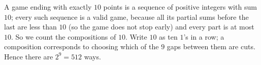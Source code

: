 A game ending with exactly $10$ points is a sequence of positive integers with sum $10$; every such sequence is a valid game, because all its partial sums before the last are less than $10$ (so the game does not stop early) and every part is at most $10$. So we count the compositions of $10$. Write $10$ as ten $1$'s in a row; a composition corresponds to choosing which of the $9$ gaps between them are cuts. Hence there are $2^9=\boxed{512}$ ways.
